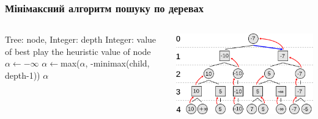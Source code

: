 \documentclass{beamer}
\begin{document}
\begin{frame}[fragile]
    \frametitle{Мінімаксний алгоритм пошуку по деревах}
    \begin{columns}
    \begin{column}{0.6\textwidth}
        \begin{algorithm}[H]

            \begin{algorithmic}[1]
                \REQUIRE Tree: node, Integer: depth
                \ENSURE Integer: value of best play
                        \RETURN the heuristic value of node
                    \ENDIF
                    \STATE $\alpha\gets-\infty$
                        \STATE $\alpha\gets$max($\alpha$, -minimax(child, depth-1))
                    \ENDFOR
                    \RETURN $\alpha$
            \end{algorithmic}
        \end{algorithm}
    \end{column}
    \begin{column}{0.4\textwidth}
        \hfill\includegraphics[height=0.3\paperheight]{minimax.png}
    \end{column}
    \end{columns}


\end{frame}
\end{document}
